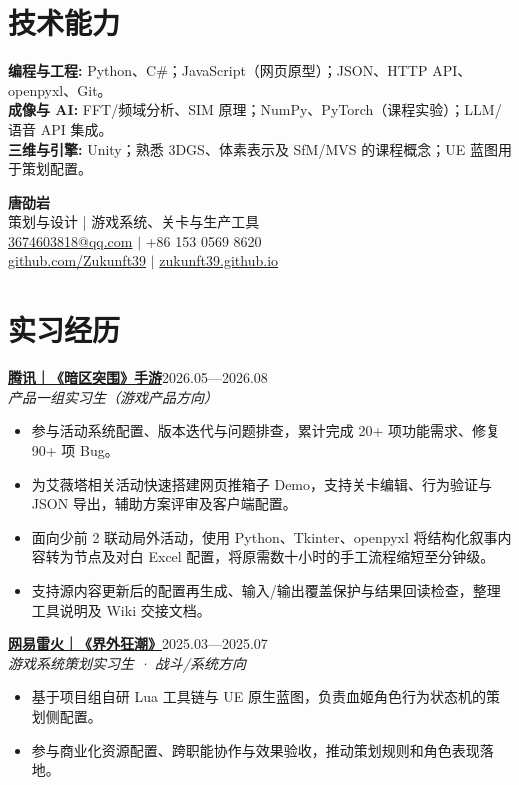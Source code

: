 \documentclass[a4paper,11pt]{article}
\newcommand{\resumeSubheading}[3]{\textbf{#1}\hfill{\small #3}\\{\small\textit{#2}}\par\vspace{3pt}}
\newcommand{\resumeItemListStart}{\begin{itemize}[leftmargin=13pt,label=\textbullet,itemsep=2.5pt,topsep=3pt,parsep=0pt]\fontsize{11pt}{15.5pt}\selectfont}
\newcommand{\resumeItemListEnd}{\end{itemize}\vspace{2pt}}
\newcommand{\resumeItem}[1]{\item #1}
\begin{document}
\section{技术能力}
{\fontsize{11pt}{15.5pt}\selectfont
\textbf{编程与工程:} Python、C\#；JavaScript（网页原型）；JSON、HTTP API、openpyxl、Git。\\[2pt]
\textbf{成像与 AI:} FFT/频域分析、SIM 原理；NumPy、PyTorch（课程实验）；LLM/语音 API 集成。\\[2pt]
\textbf{三维与引擎:} Unity；熟悉 3DGS、体素表示及 SfM/MVS 的课程概念；UE 蓝图用于策划配置。\\[2pt]
}
\newpage
\begin{center}
{\Huge\bfseries 唐劭岩}\\[3pt]
{\small 策划与设计 | 游戏系统、关卡与生产工具}\\[3pt]
{\small \href{mailto:3674603818@qq.com}{3674603818@qq.com} $|$ +86 153 0569 8620}\\[2pt]
{\small \href{https://github.com/Zukunft39}{github.com/Zukunft39} $|$ \href{https://zukunft39.github.io}{zukunft39.github.io}}
\end{center}\vspace{-6pt}
\section{实习经历}
\resumeSubheading{\href{https://zukunft39.github.io/projects/tencent.html}{腾讯｜《暗区突围》手游}}{产品一组实习生（游戏产品方向）}{2026.05—2026.08}
\resumeItemListStart
\resumeItem{参与活动系统配置、版本迭代与问题排查，累计完成 20+ 项功能需求、修复 90+ 项 Bug。}
\resumeItem{为艾薇塔相关活动快速搭建网页推箱子 Demo，支持关卡编辑、行为验证与 JSON 导出，辅助方案评审及客户端配置。}
\resumeItem{面向少前 2 联动局外活动，使用 Python、Tkinter、openpyxl 将结构化叙事内容转为节点及对白 Excel 配置，将原需数十小时的手工流程缩短至分钟级。}
\resumeItem{支持源内容更新后的配置再生成、输入/输出覆盖保护与结果回读检查，整理工具说明及 Wiki 交接文档。}
\resumeItemListEnd
\resumeSubheading{\href{https://zukunft39.github.io/projects/netease.html}{网易雷火｜《界外狂潮》}}{游戏系统策划实习生 · 战斗/系统方向}{2025.03—2025.07}
\resumeItemListStart
\resumeItem{基于项目组自研 Lua 工具链与 UE 原生蓝图，负责血姬角色行为状态机的策划侧配置。}
\resumeItem{参与商业化资源配置、跨职能协作与效果验收，推动策划规则和角色表现落地。}
\resumeItemListEnd
\end{document}
